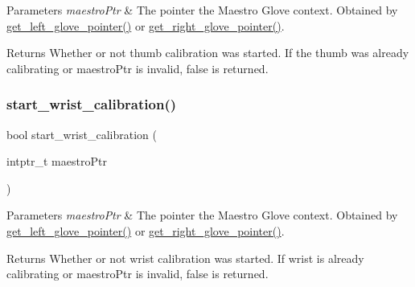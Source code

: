 \begin{DoxyParams}{Parameters}
{\em maestro\+Ptr} & The pointer the Maestro Glove context. Obtained by \hyperlink{group__glove_management_ga63ce3c99d4a8b8db851b22af9185764e}{get\+\_\+left\+\_\+glove\+\_\+pointer()} or \hyperlink{group__glove_management_ga9b8fd9d91aeac3f8da50f7a7eba0c32b}{get\+\_\+right\+\_\+glove\+\_\+pointer()}. \\
\hline
\end{DoxyParams}
\begin{DoxyReturn}{Returns}
Whether or not thumb calibration was started. If the thumb was already calibrating or {\ttfamily maestro\+Ptr} is invalid, {\ttfamily false} is returned. 
\end{DoxyReturn}
\mbox{\label{group__glove_calibration_ga7a6d895e59fe7a4f554b05ab067087cc}} 
\subsubsection{\texorpdfstring{start\+\_\+wrist\+\_\+calibration()}{start\_wrist\_calibration()}}
{\footnotesize\ttfamily bool start\+\_\+wrist\+\_\+calibration (\begin{DoxyParamCaption}\item[{intptr\+\_\+t}]{maestro\+Ptr }\end{DoxyParamCaption})}


\begin{DoxyParams}{Parameters}
{\em maestro\+Ptr} & The pointer the Maestro Glove context. Obtained by \hyperlink{group__glove_management_ga63ce3c99d4a8b8db851b22af9185764e}{get\+\_\+left\+\_\+glove\+\_\+pointer()} or \hyperlink{group__glove_management_ga9b8fd9d91aeac3f8da50f7a7eba0c32b}{get\+\_\+right\+\_\+glove\+\_\+pointer()}. \\
\hline
\end{DoxyParams}
\begin{DoxyReturn}{Returns}
Whether or not wrist calibration was started. If wrist is already calibrating or {\ttfamily maestro\+Ptr} is invalid, {\ttfamily false} is returned. 
\end{DoxyReturn}
